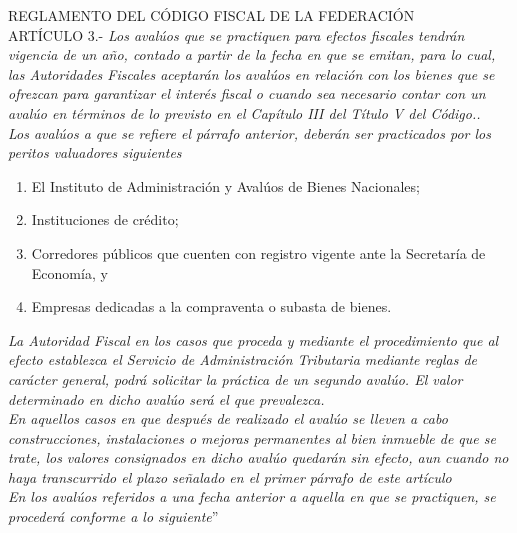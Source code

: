 

\textcolor{principal}{REGLAMENTO DEL C\'ODIGO FISCAL DE LA FEDERACI\'ON}\\


\textcolor{secundario}{ART\'ICULO 3.-} \textit{Los aval\'uos que se practiquen para efectos fiscales tendr\'an vigencia de un a\~no, contado a partir de la fecha en que se emitan, para lo cual, las Autoridades Fiscales aceptar\'an los aval\'uos en relaci\'on con los bienes que se ofrezcan para garantizar el inter\'es fiscal o cuando sea necesario contar con un aval\'uo en t\'erminos de lo previsto en el Cap\'itulo III del Título V del C\'odigo..} \\

\textit{Los aval\'uos a que se refiere el p\'arrafo anterior, deber\'an ser practicados por los peritos valuadores siguientes}

\begin{enumerate}[\indent I.]

\item El Instituto de Administraci\'on y Aval\'uos de Bienes Nacionales; 
\item Instituciones de cr\'edito; 
\item Corredores p\'ublicos que cuenten con registro vigente ante la Secretar\'ia de Econom\'ia, y 
\item Empresas dedicadas a la compraventa o subasta de bienes. 
\end{enumerate}

\textit{La Autoridad Fiscal en los casos que proceda y mediante el procedimiento que al efecto establezca el Servicio de Administraci\'on Tributaria mediante reglas de car\'acter general, podr\'a solicitar la pr\'actica de un segundo aval\'uo. El valor determinado en dicho aval\'uo ser\'a el que prevalezca. } \\

\textit{En aquellos casos en que despu\'es de realizado el aval\'uo se lleven a cabo construcciones, instalaciones o mejoras permanentes al bien inmueble de que se trate, los valores consignados en dicho aval\'uo quedar\'an sin efecto, aun cuando no haya transcurrido el plazo se\~nalado en el primer p\'arrafo de este art\'iculo} \\

\textit{En los aval\'uos referidos a una fecha anterior a aquella en que se practiquen, se proceder\'a conforme a lo siguiente}''\\

